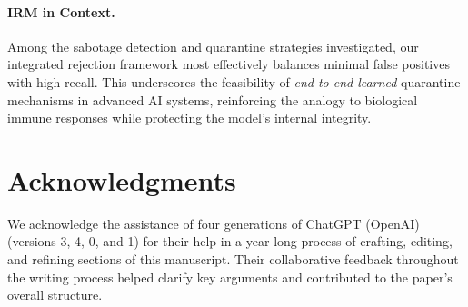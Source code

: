 \documentclass[12pt]{article}
\begin{document}
\paragraph{IRM in Context.}
Among the sabotage detection and quarantine strategies investigated,
our integrated rejection framework most effectively balances minimal false
positives with high recall. This underscores the feasibility of
\emph{end-to-end learned} quarantine mechanisms in advanced AI systems,
reinforcing the analogy to biological immune responses while protecting
the model’s internal integrity.


\section*{Acknowledgments}
We acknowledge the assistance of four generations of ChatGPT (OpenAI) (versions 3, 4, 0, and 1) for their help in a year-long process of crafting, editing, and refining sections of this manuscript. Their collaborative feedback throughout the writing process helped clarify key arguments and contributed to the paper’s overall structure.











%
%
\end{document}
